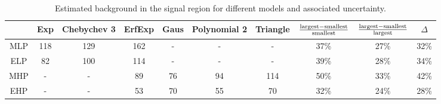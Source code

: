 \begin{landscape}
\begin{table}[p]
\begin{center}
\caption[Estimated background in the signal region for different models.]{Estimated background in the signal region for different models and associated uncertainty.}
\label{tab:bkgtest}
\begin{tabular}{cccccccccc}
\hline
               &   Exp    & Chebychev 3  &    ErfExp   &   Gaus   & Polynomial 2 & Triangle & $\frac{\rm largest-smallest}{\rm smallest}$  & $\frac{\rm largest-smallest}{\rm largest}$  & $\Delta$     \\ \hline 
   MLP     &   118    &      129            &    162        &      -       &         -            &       -       &            37\%        &        27\%          &       32\%   \\ 
   ELP     &   82      &       100           &    114        &      -       &         -            &       -       &            39\%         &        28\%          &        34\%    \\ 
   MHP    &   -         &         -             &      89         &    76      &       94           &  114       &            50\%         &        33\%         &        42\%     \\ 
   EHP     &  -          &        -              &      53         &    70     &        55           &    70        &            32\%        &        24\%         &         28\%    \\ \hline
\end{tabular}
\end{center}
\end{table}


\end{landscape}
